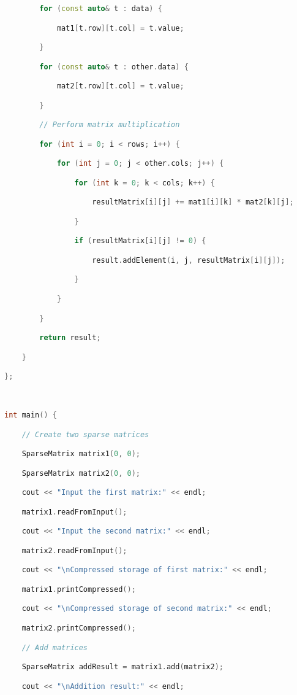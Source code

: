 \begin{lstlisting}[language=C++]
        for (const auto& t : data) {

            mat1[t.row][t.col] = t.value;

        }

        for (const auto& t : other.data) {

            mat2[t.row][t.col] = t.value;

        }

        // Perform matrix multiplication

        for (int i = 0; i < rows; i++) {

            for (int j = 0; j < other.cols; j++) {

                for (int k = 0; k < cols; k++) {

                    resultMatrix[i][j] += mat1[i][k] * mat2[k][j];

                }

                if (resultMatrix[i][j] != 0) {

                    result.addElement(i, j, resultMatrix[i][j]);

                }

            }

        }

        return result;

    }

};

  

int main() {

    // Create two sparse matrices

    SparseMatrix matrix1(0, 0);

    SparseMatrix matrix2(0, 0);

    cout << "Input the first matrix:" << endl;

    matrix1.readFromInput();

    cout << "Input the second matrix:" << endl;

    matrix2.readFromInput();

    cout << "\nCompressed storage of first matrix:" << endl;

    matrix1.printCompressed();

    cout << "\nCompressed storage of second matrix:" << endl;

    matrix2.printCompressed();

    // Add matrices

    SparseMatrix addResult = matrix1.add(matrix2);

    cout << "\nAddition result:" << endl;


\end{lstlisting}
